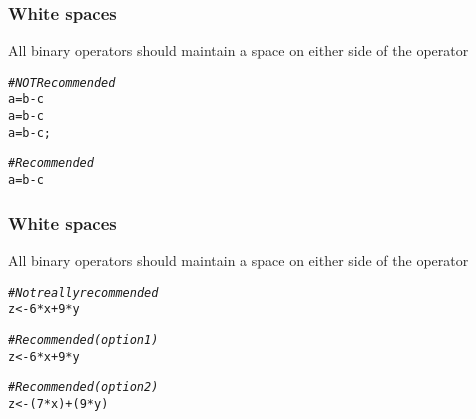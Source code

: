 \documentclass[12pt]{beamer}\usepackage[]{graphicx}\usepackage[]{color}
\makeatletter
\newcommand{\hlnum}[1]{\textcolor[rgb]{0.686,0.059,0.569}{#1}}%
\newcommand{\hlcom}[1]{\textcolor[rgb]{0.678,0.584,0.686}{\textit{#1}}}%
\newcommand{\hlopt}[1]{\textcolor[rgb]{0,0,0}{#1}}%
\newcommand{\hlstd}[1]{\textcolor[rgb]{0.345,0.345,0.345}{#1}}%
\newcommand{\hlkwb}[1]{\textcolor[rgb]{0.69,0.353,0.396}{#1}}%
\newenvironment{kframe}{%
 \def\at@end@of@kframe{}%
 \ifinner\ifhmode%
  \def\at@end@of@kframe{\end{minipage}}%
  \begin{minipage}{\columnwidth}%
 \fi\fi%
 \def\FrameCommand##1{\hskip\@totalleftmargin \hskip-\fboxsep
 \colorbox{shadecolor}{##1}\hskip-\fboxsep
     \hskip-\linewidth \hskip-\@totalleftmargin \hskip\columnwidth}%
 \MakeFramed {\advance\hsize-\width
   \@totalleftmargin\z@ \linewidth\hsize
   \@setminipage}}%
 {\par\unskip\endMakeFramed%
 \at@end@of@kframe}
\newenvironment{knitrout}{}{} %
\makeatother
\begin{document}
\begin{frame}[fragile]
\frametitle{White spaces}

All binary operators should maintain a space on either side of the operator
\begin{knitrout}\footnotesize
{}\color{fgcolor}\begin{kframe}
\begin{alltt}
\hlcom{# NOT Recommended }
\hlstd{a}\hlkwb{=}\hlstd{b}\hlopt{-}\hlstd{c}
\hlstd{a} \hlkwb{=} \hlstd{b}\hlopt{-}\hlstd{c}
\hlstd{a}\hlkwb{=}\hlstd{b} \hlopt{-} \hlstd{c;}

\hlcom{# Recommended }
\hlstd{a} \hlkwb{=} \hlstd{b} \hlopt{-} \hlstd{c}
\end{alltt}
\end{kframe}
\end{knitrout}

\end{frame}


\begin{frame}[fragile]
\frametitle{White spaces}

All binary operators should maintain a space on either side of the operator
\begin{knitrout}\footnotesize
{}\color{fgcolor}\begin{kframe}
\begin{alltt}
\hlcom{# Not really recommended }
\hlstd{z} \hlkwb{<-} \hlnum{6}\hlopt{*}\hlstd{x} \hlopt{+} \hlnum{9}\hlopt{*}\hlstd{y}

\hlcom{# Recommended (option 1)}
\hlstd{z} \hlkwb{<-} \hlnum{6} \hlopt{*} \hlstd{x} \hlopt{+} \hlnum{9} \hlopt{*} \hlstd{y}

\hlcom{# Recommended (option 2)}
\hlstd{z} \hlkwb{<-} \hlstd{(}\hlnum{7} \hlopt{*} \hlstd{x)} \hlopt{+} \hlstd{(}\hlnum{9} \hlopt{*} \hlstd{y)}
\end{alltt}
\end{kframe}
\end{knitrout}

\end{frame}

\end{document}

